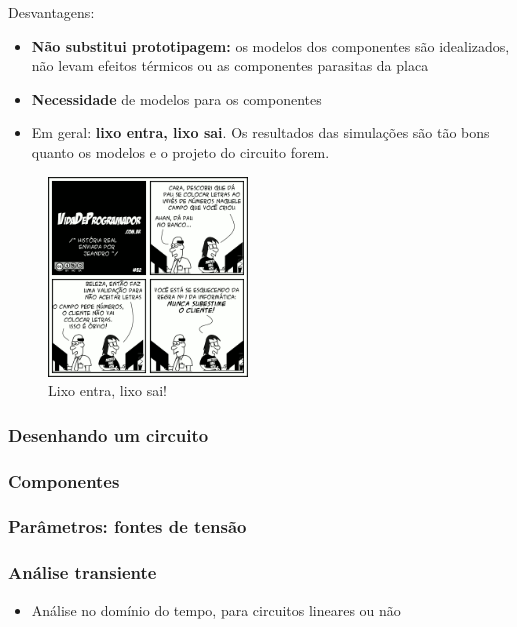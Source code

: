 \documentclass{beamer}
\begin{document}
\begin{frame}
Desvantagens:
\begin{itemize}
\item{\textbf{Não substitui prototipagem:} os modelos dos componentes são idealizados, não levam efeitos térmicos ou as componentes parasitas da placa}
\item{\textbf{Necessidade} de modelos para os componentes}

\item{Em geral: \textbf{lixo entra, lixo sai}. Os resultados das simulações são tão bons quanto os modelos e o projeto do circuito forem.}
\end{itemize}
\end{frame}

\begin{frame}

\begin{figure}[htb]
\includegraphics[width=200px]{images/tirinha32}
\caption{Lixo entra, lixo sai!}
\label{fig:lixoentrasai}
\end{figure}

\end{frame}

\begin{frame}
\frametitle{Desenhando um circuito}
\end{frame}

\begin{frame}
\frametitle{Componentes}
\end{frame}

\begin{frame}
\frametitle{Parâmetros: fontes de tensão}
\end{frame}

\begin{frame}
\frametitle{Análise transiente}
\begin{itemize}
\item{Análise no domínio do tempo, para circuitos lineares ou não}
\end{itemize}
\end{frame}
\end{document}
